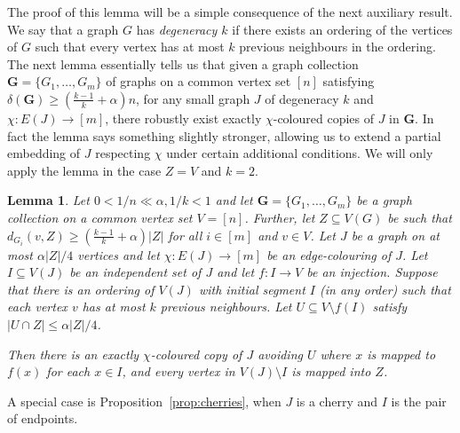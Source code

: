 \documentclass[11pt, dvipsnames]{amsart}
\theoremstyle{plain}
\newtheorem{lemma}[theo]{Lemma}
\theoremstyle{definition}
\newcommand{\sm}{\setminus}
\newcommand{\aA}{\alpha}
\begin{document}
The proof of this lemma will be a simple consequence of the next auxiliary result.
We say that a graph $G$ has {\it degeneracy $k$} if there exists an ordering of the vertices of $G$ such that every vertex has at most $k$ previous neighbours in the ordering. The next lemma essentially tells us that given a graph collection $\mathbf{G}=\{G_1, \ldots, G_m\}$ of graphs on a common vertex set $[n]$ satisfying $\delta(\mathbf{G})\geq (\frac{k-1}{k}+\aA)n $, for any small graph $J$ of degeneracy $k$  and $\chi: E(J) \rightarrow [m]$, there robustly exist exactly $\chi$-coloured copies of $J$ in $\mathbf{G}$. In fact the lemma says something slightly stronger, allowing us to extend a partial embedding of $J$ respecting $\chi$ under certain additional conditions.  
We will only apply the lemma in the case $Z=V$ and $k=2$.

\begin{lemma}\label{lemma:degenk}
Let $0<1/n \ll \aA,1/k < 1$ and 
let $\mathbf{G}=\{G_1,\ldots,G_m\}$ be a graph collection on a common vertex set $V=[n]$. Further, 
 let $Z \subseteq V(G)$
 be such that $ d_{G_i}(v,Z) \geq \left(\frac{k-1}{k}+\aA\right)|Z|$ for all $i \in [m]$
and $v \in V$.
Let $J$ be a graph on at most $\aA|Z|/4$ vertices and let $\chi : E(J) \to [m]$ be an edge-colouring of $J$.
Let $I \subseteq V(J)$ be an independent set of $J$ and let $f: I \to V$ be an injection.
Suppose that there is an ordering of $V(J)$ with initial segment $I$ (in any order)
such that each vertex $v$ has at most $k$ previous neighbours.
Let $U \subseteq V \sm f(I)$ satisfy $|U \cap Z| \leq \aA|Z|/4$.

Then there is an exactly $\chi$-coloured copy of $J$ avoiding $U$
where $x$ is mapped to $f(x)$ for each $x \in I$, and every vertex in $V(J) \sm I$ is mapped into $Z$.
\end{lemma}

A special case is Proposition~\ref{prop:cherries}, when $J$ is a cherry and $I$ is the pair of endpoints. 
\end{document}
